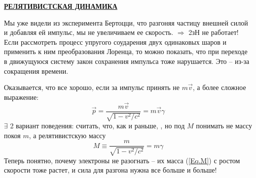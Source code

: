 \documentclass[12pt,epsfig,color,russian]{article}
\begin{document}
   \centerline{\LARGE\bf \underline{РЕЛЯТИВИСТСКАЯ ДИНАМИКА}}
   Мы уже видели из эксперимента Бертоцци, что разгоняя частицу внешней силой и добавляя ей импульс, мы не увеличиваем ее скорость. $\Rightarrow$ 2зН не работает!
   Если рассмотреть процесс упругого соударения двух одинаковых шаров и применить к ним преобразования Лоренца, то можно показать, что при переходе в движущуюся систему закон сохранения импульса тоже нарушается. Это -- из-за сокращения времени.

   Оказывается, что все хорошо, если за импульс принять не $m\vec{v}$, а более сложное выражение:
  \begin{equation}
  \vec{p}=\frac{m\vec{v}}{\sqrt{1-v^2/c^2}} =m\vec{v}\gamma
  \end{equation}
   $\exists$ 2 вариант поведения: считать, что, как и раньше, , но под  $M$ понимать не массу покоя $m$, а релятивистскую массу
  \begin{equation}\label{Eq.M}
  M\equiv\frac{m}{\sqrt{1-v^2/c^2}} =m\gamma
  \end{equation}
Теперь понятно, почему электроны не разогнать -- их масса (\ref{Eq.M}) с ростом скорости тоже растет, и сила для разгона нужна все больше и больше!
\end{document}
